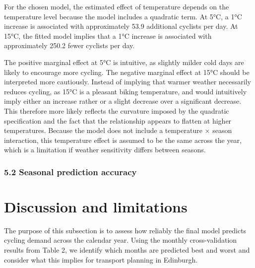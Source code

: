 \documentclass[
]{article}
\begin{document}
For the chosen model, the estimated effect of temperature depends on the
temperature level because the model includes a quadratic term. At 5°C, a
1°C increase is associated with approximately 53.9 additional cyclists
per day. At 15°C, the fitted model implies that a 1°C increase is
associated with approximately 250.2 fewer cyclists per day.

The positive marginal effect at 5°C is intuitive, as slightly milder
cold days are likely to encourage more cycling. The negative marginal
effect at 15°C should be interpreted more cautiously. Instead of
implying that warmer weather necessarily reduces cycling, as 15°C is a
pleasant biking temperature, and would intuitively imply either an
increase rather or a slight decrease over a significant decrease. This
therefore more likely reflects the curvature imposed by the quadratic
specification and the fact that the relationship appears to flatten at
higher temperatures. Because the model does not include a temperature ×
season interaction, this temperature effect is assumed to be the same
across the year, which is a limitation if weather sensitivity differs
between seasons.

\subsubsection{5.2 Seasonal prediction
accuracy}\label{seasonal-prediction-accuracy}

\section{Discussion and limitations}\label{discussion-and-limitations}

The purpose of this subsection is to assess how reliably the final model
predicts cycling demand across the calendar year. Using the monthly
cross-validation results from Table 2, we identify which months are
predicted best and worst and consider what this implies for transport
planning in Edinburgh.
\end{document}
